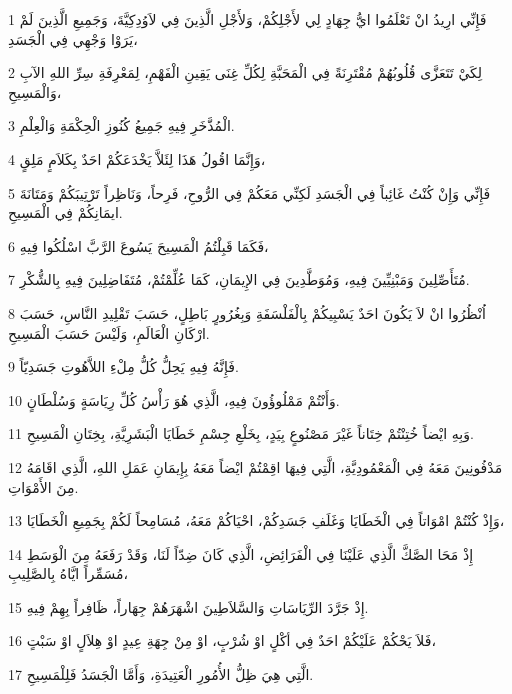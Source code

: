 \par 1 فَإِنِّي ارِيدُ انْ تَعْلَمُوا ايُّ جِهَادٍ لِي لأَجْلِكُمْ، وَلأَجْلِ الَّذِينَ فِي لاَوُدِكِيَّةَ، وَجَمِيعِ الَّذِينَ لَمْ يَرَوْا وَجْهِي فِي الْجَسَدِ،
\par 2 لِكَيْ تَتَعَزَّى قُلُوبُهُمْ مُقْتَرِنَةً فِي الْمَحَبَّةِ لِكُلِّ غِنَى يَقِينِ الْفَهْمِ، لِمَعْرِفَةِ سِرِّ اللهِ الآبِ وَالْمَسِيحِ،
\par 3 الْمُذَّخَرِ فِيهِ جَمِيعُ كُنُوزِ الْحِكْمَةِ وَالْعِلْمِ.
\par 4 وَإِنَّمَا اقُولُ هَذَا لِئَلاَّ يَخْدَعَكُمْ احَدٌ بِكَلاَمٍ مَلِقٍ،
\par 5 فَإِنِّي وَإِنْ كُنْتُ غَائِباً فِي الْجَسَدِ لَكِنِّي مَعَكُمْ فِي الرُّوحِ، فَرِحاً، وَنَاظِراً تَرْتِيبَكُمْ وَمَتَانَةَ ايمَانِكُمْ فِي الْمَسِيحِ.
\par 6 فَكَمَا قَبِلْتُمُ الْمَسِيحَ يَسُوعَ الرَّبَّ اسْلُكُوا فِيهِ،
\par 7 مُتَأَصِّلِينَ وَمَبْنِيِّينَ فِيهِ، وَمُوَطَّدِينَ فِي الإِيمَانِ، كَمَا عُلِّمْتُمْ، مُتَفَاضِلِينَ فِيهِ بِالشُّكْرِ.
\par 8 اُنْظُرُوا انْ لاَ يَكُونَ احَدٌ يَسْبِيكُمْ بِالْفَلْسَفَةِ وَبِغُرُورٍ بَاطِلٍ، حَسَبَ تَقْلِيدِ النَّاسِ، حَسَبَ ارْكَانِ الْعَالَمِ، وَلَيْسَ حَسَبَ الْمَسِيحِ.
\par 9 فَإِنَّهُ فِيهِ يَحِلُّ كُلُّ مِلْءِ اللاَّهُوتِ جَسَدِيّاً.
\par 10 وَأَنْتُمْ مَمْلُوؤُونَ فِيهِ، الَّذِي هُوَ رَأْسُ كُلِّ رِيَاسَةٍ وَسُلْطَانٍ.
\par 11 وَبِهِ ايْضاً خُتِنْتُمْ خِتَاناً غَيْرَ مَصْنُوعٍ بِيَدٍ، بِخَلْعِ جِسْمِ خَطَايَا الْبَشَرِيَّةِ، بِخِتَانِ الْمَسِيحِ.
\par 12 مَدْفُونِينَ مَعَهُ فِي الْمَعْمُودِيَّةِ، الَّتِي فِيهَا اقِمْتُمْ ايْضاً مَعَهُ بِإِيمَانِ عَمَلِ اللهِ، الَّذِي اقَامَهُ مِنَ الأَمْوَاتِ.
\par 13 وَإِذْ كُنْتُمْ امْوَاتاً فِي الْخَطَايَا وَغَلَفِ جَسَدِكُمْ، احْيَاكُمْ مَعَهُ، مُسَامِحاً لَكُمْ بِجَمِيعِ الْخَطَايَا،
\par 14 إِذْ مَحَا الصَّكَّ الَّذِي عَلَيْنَا فِي الْفَرَائِضِ، الَّذِي كَانَ ضِدّاً لَنَا، وَقَدْ رَفَعَهُ مِنَ الْوَسَطِ مُسَمِّراً ايَّاهُ بِالصَّلِيبِ،
\par 15 إِذْ جَرَّدَ الرِّيَاسَاتِ وَالسَّلاَطِينَ اشْهَرَهُمْ جِهَاراً، ظَافِراً بِهِمْ فِيهِ.
\par 16 فَلاَ يَحْكُمْ عَلَيْكُمْ احَدٌ فِي أكْلٍ اوْ شُرْبٍ، اوْ مِنْ جِهَةِ عِيدٍ اوْ هِلاَلٍ اوْ سَبْتٍ،
\par 17 الَّتِي هِيَ ظِلُّ الأُمُورِ الْعَتِيدَةِ، وَأَمَّا الْجَسَدُ فَلِلْمَسِيحِ.
